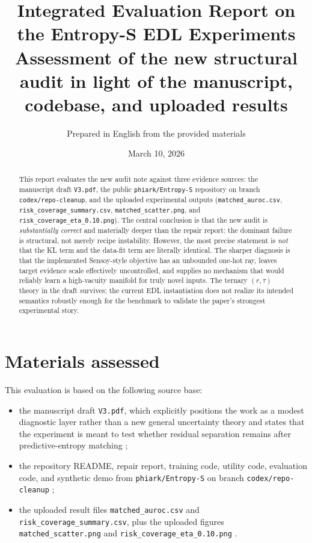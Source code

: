 \documentclass[11pt]{article}
\title{\textbf{Integrated Evaluation Report on the Entropy-S EDL Experiments}\\
\large Assessment of the new structural audit in light of the manuscript, codebase, and uploaded results}
\author{Prepared in English from the provided materials}
\date{March 10, 2026}
\begin{document}
\maketitle

\begin{abstract}
This report evaluates the new audit note against three evidence sources: the manuscript draft \texttt{V3.pdf}, the public \texttt{phiark/Entropy-S} repository on branch \texttt{codex/repo-cleanup}, and the uploaded experimental outputs (\texttt{matched\_auroc.csv}, \texttt{risk\_coverage\_summary.csv}, \texttt{matched\_scatter.png}, and \texttt{risk\_coverage\_eta\_0.10.png}). The central conclusion is that the new audit is \emph{substantially correct} and materially deeper than the repair report: the dominant failure is structural, not merely recipe instability. However, the most precise statement is \emph{not} that the KL term and the data-fit term are literally identical. The sharper diagnosis is that the implemented Sensoy-style objective has an unbounded one-hot ray, leaves target evidence scale effectively uncontrolled, and supplies no mechanism that would reliably learn a high-vacuity manifold for truly novel inputs. The ternary $(r,\tau)$ theory in the draft survives; the current EDL instantiation does not realize its intended semantics robustly enough for the benchmark to validate the paper's strongest experimental story.
\end{abstract}

\section{Materials assessed}

This evaluation is based on the following source base:
\begin{itemize}[leftmargin=1.5em]
  \item the manuscript draft \texttt{V3.pdf}, which explicitly positions the work as a modest diagnostic layer rather than a new general uncertainty theory and states that the experiment is meant to test whether residual separation remains after predictive-entropy matching \cite{draft};
  \item the repository README, repair report, training code, utility code, evaluation code, and synthetic demo from \texttt{phiark/Entropy-S} on branch \texttt{codex/repo-cleanup} \cite{readme,repair,train,utils,eval,synthetic};
  \item the uploaded result files \texttt{matched\_auroc.csv} and \texttt{risk\_coverage\_summary.csv}, plus the uploaded figures \texttt{matched\_scatter.png} and \texttt{risk\_coverage\_eta\_0.10.png} \cite{csv-auroc,csv-risk}.
\end{itemize}
\end{document}
